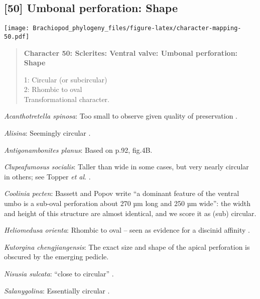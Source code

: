 \documentclass[openany]{book}
\theoremstyle{definition}
\theoremstyle{definition}
\theoremstyle{definition}
\theoremstyle{remark}
\begin{document}
\subsection*{{[}50{]} Umbonal perforation:
Shape}\label{umbonal-perforation-shape}

\texttt{[image: Brachiopod\_phylogeny\_files/figure-latex/character-mapping-50.pdf]}

\begin{quote}
\textbf{Character 50: Sclerites: Ventral valve: Umbonal perforation:
Shape}

1: Circular (or subcircular)\\
2: Rhombic to oval\\
Transformational character.
\end{quote}

\hypertarget{Acanthotretella_spinosa-coding-50}{}
\emph{Acanthotretella spinosa}: Too small to observe given quality of
preservation \citep{Holmer2006Aspinose}.

\hypertarget{Alisina-coding-50}{}
\emph{Alisina}: Seemingly circular \citep{Zhang2011Anobolellate}.

\hypertarget{Antigonambonites_planus-coding-50}{}
\emph{Antigonambonites planus}: Based on p.92, fig.4B.

\hypertarget{Clupeafumosus_socialis-coding-50}{}
\emph{Clupeafumosus socialis}: Taller than wide in some cases, but very
nearly circular in others; see Topper \emph{et al}.
\citeyearpar{Topper2013Reappraisalof}.

\hypertarget{Coolinia_pecten-coding-50}{}
\emph{Coolinia pecten}: Bassett and Popov write ``a dominant feature of
the ventral umbo is a sub-oval perforation about 270 µm long and 250 µm
wide'': the width and height of this structure are almost identical, and
we score it as (sub) circular.

\hypertarget{Heliomedusa_orienta-coding-50}{}
\emph{Heliomedusa orienta}: Rhombic to oval -- seen as evidence for a
discinid affinity \citep{Chen2007Reinterpretationof}.

\hypertarget{Kutorgina_chengjiangensis-coding-50}{}
\emph{Kutorgina chengjiangensis}: The exact size and shape of the apical
perforation is obscured by the emerging pedicle.

\hypertarget{Nisusia_sulcata-coding-50}{}
\emph{Nisusia sulcata}: ``close to circular''
\citep{Holmer2018Evolutionarysignificance}.

\hypertarget{Salanygolina-coding-50}{}
\emph{Salanygolina}: Essentially circular \citep[fig.
4]{Holmer2009Theenigmatic}.
\end{document}
